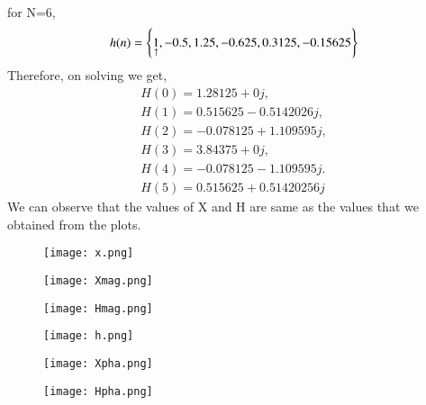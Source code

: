 \documentclass[journal,12pt,twocolumn]{IEEEtran}
\renewcommand\thesection{\arabic{section}}
\begin{document}
\begin{enumerate}[label=\thesection.\arabic*.,ref=\thesection.\theenumi]
\begin{align}
\end{align}
for N=6,
\begin{align}
     h(n) = \left\{\underset{\uparrow}{1},-0.5,1.25,-0.625,0.3125,-0.15625\right\} 
\end{align}
Therefore, on solving we get,
\begin{align}
    H(0) = 1.28125 + 0j,\\
    H(1) = 0.515625 - 0.5142026j,\\
    H(2) = -0.078125 + 1.109595j,\\
    H(3) = 3.84375 + 0j,\\
    H(4) = -0.078125 - 1.109595j.\\
    H(5) = 0.515625 + 0.51420256j
\end{align}
We can observe that the values of X and H are same as the values that we obtained from the plots.

\begin{figure}[h!]
    \centering
    \texttt{[image: x.png]}
    \label{figs}
\end{figure}
\begin{figure}[h!]
    \centering
    \texttt{[image: Xmag.png]}
    \label{figs}
\end{figure}
\begin{figure}[h!]
    \centering
    \texttt{[image: Hmag.png]}
    \label{figs}
\end{figure}
\begin{figure}[h!]
    \centering
    \texttt{[image: h.png]}
    \label{figs}
\end{figure}
\vspace{1cm}
\begin{figure}[h!]
    \centering
    \texttt{[image: Xpha.png]}
    \label{figs}
\end{figure}
\begin{figure}[h!]
    \centering
    \texttt{[image: Hpha.png]}
    \label{figs}
\end{figure}




\end{enumerate}
\end{document}
